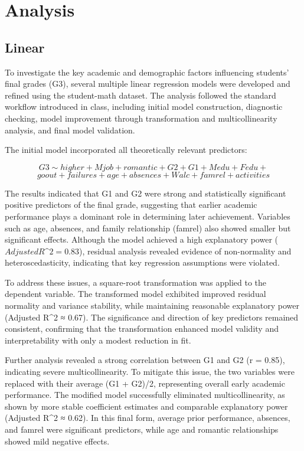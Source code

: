 \documentclass[9pt,twocolumn,twoside,]{pinp}
\begin{document}
\section{Analysis}\label{analysis}

\subsection{Linear}\label{linear}

To investigate the key academic and demographic factors influencing
students' final grades (G3), several multiple linear regression models
were developed and refined using the student-math dataset. The analysis
followed the standard workflow introduced in class, including initial
model construction, diagnostic checking, model improvement through
transformation and multicollinearity analysis, and final model
validation.

The initial model incorporated all theoretically relevant predictors:

\[G3 \sim higher + Mjob + romantic + G2 + G1 + Medu + Fedu + \]
\[goout + failures + age + absences + Walc + famrel + activities\]

The results indicated that G1 and G2 were strong and statistically
significant positive predictors of the final grade, suggesting that
earlier academic performance plays a dominant role in determining later
achievement. Variables such as age, absences, and family relationship
(famrel) also showed smaller but significant effects. Although the model
achieved a high explanatory power (\(Adjusted R\^2 = 0.83\)), residual
analysis revealed evidence of non-normality and heteroscedasticity,
indicating that key regression assumptions were violated.

To address these issues, a square-root transformation was applied to the
dependent variable. The transformed model exhibited improved residual
normality and variance stability, while maintaining reasonable
explanatory power (Adjusted R\^{}2 ≈ 0.67). The significance and
direction of key predictors remained consistent, confirming that the
transformation enhanced model validity and interpretability with only a
modest reduction in fit.

Further analysis revealed a strong correlation between G1 and G2 (r =
0.85), indicating severe multicollinearity. To mitigate this issue, the
two variables were replaced with their average (G1 + G2)/2, representing
overall early academic performance. The modified model successfully
eliminated multicollinearity, as shown by more stable coefficient
estimates and comparable explanatory power (Adjusted R\^{}2 ≈ 0.62). In
this final form, average prior performance, absences, and famrel were
significant predictors, while age and romantic relationships showed mild
negative effects.
\end{document}
